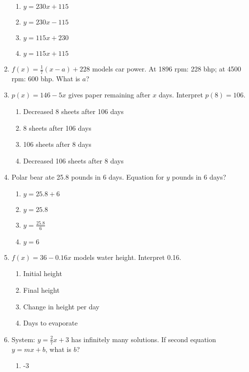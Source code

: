 \documentclass[12pt]{exam}
\begin{document}
\begin{enumerate}
    \begin{enumerate}[label=\Alph*)]
        \item $y = 230x + 115$
        \item $y = 230x - 115$
        \item $y = 115x + 230$
        \item $y = 115x + 115$
    \end{enumerate}
    \item $f(x) = \frac{1}{7}(x - a) + 228$ models car power. At 1896 rpm: 228 bhp; at 4500 rpm: 600 bhp. What is $a$?
    \item $p(x) = 146 - 5x$ gives paper remaining after $x$ days. Interpret $p(8) = 106$.
    \begin{enumerate}[label=\Alph*)]
        \item Decreased 8 sheets after 106 days
        \item 8 sheets after 106 days
        \item 106 sheets after 8 days
        \item Decreased 106 sheets after 8 days
    \end{enumerate}
    \item Polar bear ate 25.8 pounds in 6 days. Equation for $y$ pounds in 6 days?
    \begin{enumerate}[label=\Alph*)]
        \item $y = 25.8 + 6$
        \item $y = 25.8$
        \item $y = \frac{25.8}{6}$
        \item $y = 6$
    \end{enumerate}
    \item $f(x) = 36 - 0.16x$ models water height. Interpret 0.16.
    \begin{enumerate}[label=\Alph*)]
        \item Initial height
        \item Final height
        \item Change in height per day
        \item Days to evaporate
    \end{enumerate}
    \item System: $y = \frac{2}{7}x + 3$ has infinitely many solutions. If second equation $y = mx + b$, what is $b$?
    \begin{enumerate}[label=\Alph*)]
        \item -3

\end{enumerate}
\end{enumerate}
\end{document}
